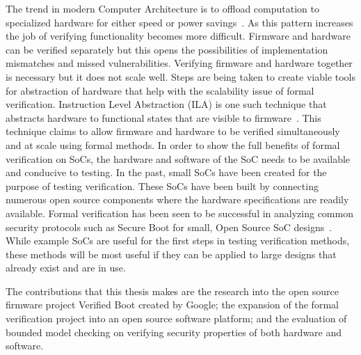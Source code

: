 \documentclass[../report.tex]{subfiles}
\begin{document}
The trend in modern Computer Architecture is to offload computation to specialized hardware for either speed or power savings~\cite{hardware-accel}.
As this pattern increases the job of verifying functionality  becomes more difficult.
Firmware and hardware can be verified separately but this opens the possibilities of implementation mismatches and missed vulnerabilities.
Verifying firmware and hardware together is necessary but it does not scale well. 
Steps are being taken to create viable tools for abstraction of hardware that help with the scalability issue of formal verification.
Instruction Level Abstraction (ILA) is one such technique that abstracts hardware to functional states that are visible to firmware~\cite{ila}.
This technique claims to allow firmware and hardware to be verified simultaneously and at scale using formal methods.
In order to show the full benefits of formal verification on SoCs, the hardware and software of the SoC needs to be available and conducive to testing.
In the past, small SoCs have been created for the purpose of testing verification.
These SoCs have been built by connecting numerous open source components where the hardware specifications are readily available.
Formal verification has been seen to be successful in analyzing common security protocols such as Secure Boot for small, Open Source SoC designs~\cite{elane}. 
While example SoCs are useful for the first steps in testing verification methods, these methods will be most useful if they can be applied to large designs that already exist and are in use.

The contributions that this thesis makes are the research into the open source firmware project Verified Boot created by Google; the expansion of the formal verification project into an open source software platform; and the evaluation of bounded model checking on verifying security properties of both hardware and software.

\end{document}

